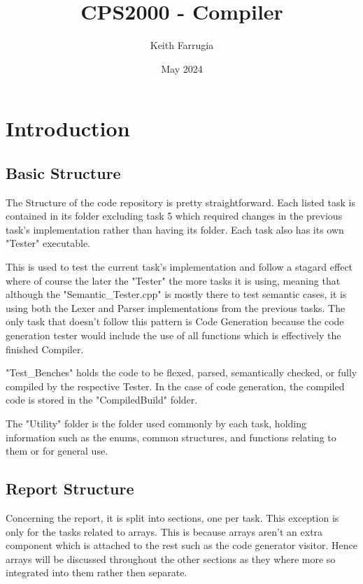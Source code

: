 \documentclass[12pt, a4paper]{report}
\title{CPS2000 - Compiler}
\author{Keith Farrugia}
\date{May 2024}
\begin{document}
\maketitle
\tableofcontents



\chapter{Introduction}
\section{Basic Structure}
The Structure of the code repository is pretty straightforward. Each listed task is contained in its folder excluding task 5 which required changes in the previous task's implementation rather than having its folder. Each task also has its own "Tester" executable. 

This is used to test the current task's implementation and follow a stagard effect where of course the later the "Tester" the more tasks it is using, meaning that although the "Semantic\_Tester.cpp" is mostly there to test semantic cases, it is using both the Lexer and Parser implementations from the previous tasks. The only task that doesn't follow this pattern is Code Generation because the code generation tester would include the use of all functions which is effectively the finished Compiler. 

"Test\_Benches" holds the code to be flexed, parsed, semantically checked, or fully compiled by the respective Tester. In the case of code generation, the compiled code is stored in the "CompiledBuild" folder. 

The "Utility" folder is the folder used commonly by each task, holding information such as the enums, common structures, and functions relating to them or for general use.

\section{Report Structure}
Concerning the report, it is split into sections, one per task. This exception is only for the tasks related to arrays. This is because arrays aren't an extra component which is attached to the rest such as the code generator visitor. Hence arrays will be discussed throughout the other sections as they where more so integrated into them rather then separate.
\end{document}
